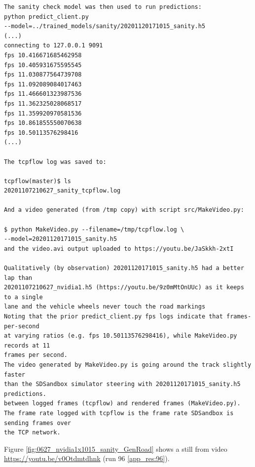 \begin{verbatim}
The sanity check model was then used to run predictions:
python predict_client.py 
--model=../trained_models/sanity/20201120171015_sanity.h5
(...)
connecting to 127.0.0.1 9091
fps 10.416671685462958
fps 10.405931675595545
fps 11.030877564739708
fps 11.092089084017463
fps 11.466601323987536
fps 11.362325028068517
fps 11.359920970581536
fps 10.861855550070638
fps 10.50113576298416
(...)

The tcpflow log was saved to:

tcpflow(master)$ ls
20201107210627_sanity_tcpflow.log

And a video generated (from /tmp copy) with script src/MakeVideo.py:

$ python MakeVideo.py --filename=/tmp/tcpflow.log \ 
--model=20201120171015_sanity.h5 
and the video.avi output uploaded to https://youtu.be/JaSkkh-2xtI

Qualitatively (by observation) 20201120171015_sanity.h5 had a better lap than 
20201107210627_nvidia1.h5 (https://youtu.be/9z0mMtOnUUc) as it keeps to a single 
lane and the vehicle wheels never touch the road markings
Noting that the prior predict_client.py fps logs indicate that frames-per-second 
at varying ratios (e.g. fps 10.50113576298416), while MakeVideo.py records at 11
frames per second.
The video generated by MakeVideo.py is going around the track slightly faster
than the SDSandbox simulator steering with 20201120171015_sanity.h5 predictions.
between logged frames (tcpflow) and rendered frames (MakeVideo.py).
The frame rate logged with tcpflow is the frame rate SDSandbox is sending frames over
the TCP network.
\end{verbatim}
Figure \ref{fig:0627_nvidia1x1015_sanity_GenRoad} shows a still from video \url{https://youtu.be/v0Otdmtdhnk} (run 96 \ref{app_res:96}).

